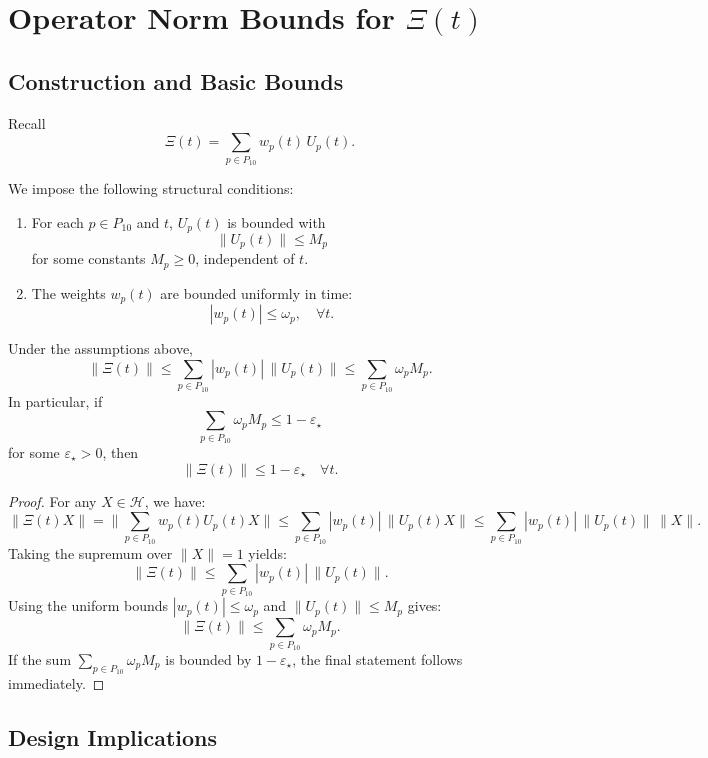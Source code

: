 \documentclass[11pt]{article}
\begin{document}
\section{Operator Norm Bounds for \texorpdfstring{\(\Xi(t)\)}{Xi(t)}}

\subsection{Construction and Basic Bounds}

Recall
\[
  \Xi(t) = \sum_{p \in P_{10}} w_p(t) \, U_p(t).
\]

We impose the following structural conditions:
\begin{enumerate}
  \item For each \(p \in P_{10}\) and \(t\), \(U_p(t)\) is bounded with
  \[
    \|U_p(t)\| \leq M_p
  \]
  for some constants \(M_p \geq 0\), independent of \(t\).
  \item The weights \(w_p(t)\) are bounded uniformly in time:
  \[
    |w_p(t)| \leq \omega_p, \quad \forall t.
  \]
\end{enumerate}

\begin{lemma}
Under the assumptions above,
\[
  \|\Xi(t)\| \leq \sum_{p \in P_{10}} |w_p(t)| \, \|U_p(t)\|
  \leq \sum_{p \in P_{10}} \omega_p M_p.
\]
In particular, if
\[
  \sum_{p \in P_{10}} \omega_p M_p \leq 1 - \varepsilon_\star
\]
for some \(\varepsilon_\star > 0\), then
\[
  \|\Xi(t)\| \leq 1 - \varepsilon_\star \quad \forall t.
\]
\end{lemma}

\begin{proof}
For any \(X \in \mathcal{H}\), we have:
\[
  \|\Xi(t) X\|
  = \Big\| \sum_{p \in P_{10}} w_p(t) U_p(t) X \Big\|
  \leq \sum_{p \in P_{10}} |w_p(t)| \, \|U_p(t) X\|
  \leq \sum_{p \in P_{10}} |w_p(t)| \, \|U_p(t)\| \, \|X\|.
\]
Taking the supremum over \(\|X\| = 1\) yields:
\[
  \|\Xi(t)\| \leq \sum_{p \in P_{10}} |w_p(t)| \, \|U_p(t)\|.
\]
Using the uniform bounds \(|w_p(t)| \leq \omega_p\) and \(\|U_p(t)\| \leq M_p\) gives:
\[
  \|\Xi(t)\| \leq \sum_{p \in P_{10}} \omega_p M_p.
\]
If the sum \(\sum_{p \in P_{10}} \omega_p M_p\) is bounded by \(1 - \varepsilon_\star\), the final statement follows immediately.
\end{proof}

\subsection{Design Implications}
\end{document}
